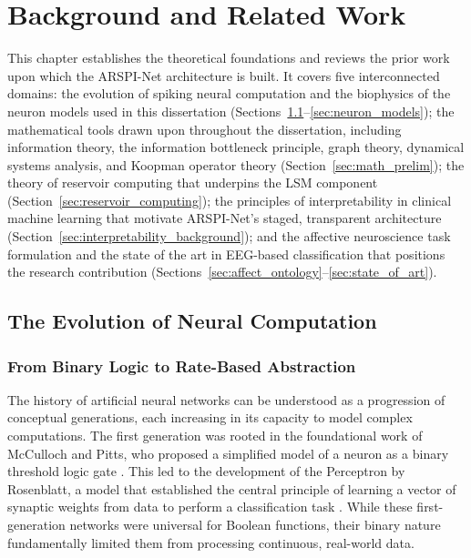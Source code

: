 \chapter{Background and Related Work}
\label{chap:background}

This chapter establishes the theoretical foundations and reviews the prior work upon which the ARSPI-Net architecture is built. It covers five interconnected domains: the evolution of spiking neural computation and the biophysics of the neuron models used in this dissertation (Sections~\ref{sec:neural_paradigms}--\ref{sec:neuron_models}); the mathematical tools drawn upon throughout the dissertation, including information theory, the information bottleneck principle, graph theory, dynamical systems analysis, and Koopman operator theory (Section~\ref{sec:math_prelim}); the theory of reservoir computing that underpins the LSM component (Section~\ref{sec:reservoir_computing}); the principles of interpretability in clinical machine learning that motivate ARSPI-Net's staged, transparent architecture (Section~\ref{sec:interpretability_background}); and the affective neuroscience task formulation and the state of the art in EEG-based classification that positions the research contribution (Sections~\ref{sec:affect_ontology}--\ref{sec:state_of_art}).

\section{The Evolution of Neural Computation}
\label{sec:neural_paradigms}

\subsection{From Binary Logic to Rate-Based Abstraction}
The history of artificial neural networks can be understood as a progression of conceptual generations, each increasing in its capacity to model complex computations. The first generation was rooted in the foundational work of McCulloch and Pitts, who proposed a simplified model of a neuron as a binary threshold logic gate \cite{mcculloch_logical_1943}. This led to the development of the Perceptron by Rosenblatt, a model that established the central principle of learning a vector of synaptic weights from data to perform a classification task \cite{rosenblatt_perceptron_1958}. While these first-generation networks were universal for Boolean functions, their binary nature fundamentally limited them from processing continuous, real-world data.

